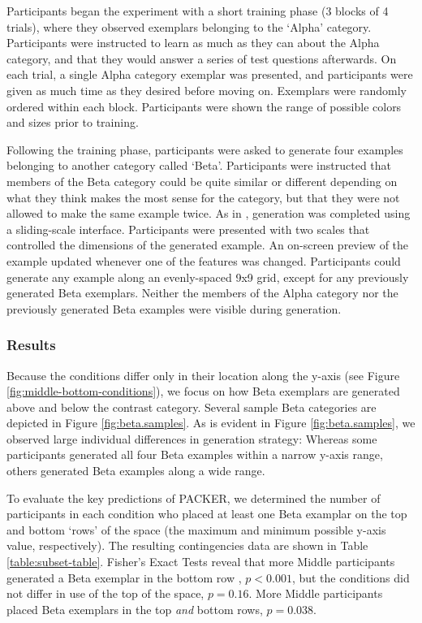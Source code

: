 \documentclass[10pt,letterpaper]{article}
\begin{document}
Participants began the experiment with a short training phase (3 blocks of 4 trials), where they observed exemplars belonging to the `Alpha' category. Participants were instructed to learn as much as they can about the Alpha category, and that they would answer a series of test questions afterwards. On each trial, a single Alpha category exemplar was presented, and participants were given as much time as they desired before moving on. Exemplars were randomly ordered within each block. Participants were shown the range of possible colors and sizes prior to training.

Following the training phase, participants were asked to generate four examples belonging to another category called `Beta'. Participants were instructed that members of the Beta category could be quite similar or different depending on what they think makes the most sense for the category, but that they were not allowed to make the same example twice. As in \citet{jern2013probabilistic}, generation was completed using a sliding-scale interface. Participants were presented with two scales that controlled the dimensions of the generated example. An on-screen preview of the example updated whenever one of the features was changed. Participants could generate any example along an evenly-spaced 9x9 grid, except for any previously generated Beta exemplars. Neither the members of the Alpha category nor the previously generated Beta examples were visible during generation. 

\subsubsection{Results}

Because the conditions differ only in their location along the y-axis (see Figure \ref{fig:middle-bottom-conditions}), we focus on how Beta exemplars are generated above and below the contrast category. Several sample Beta categories are depicted in Figure \ref{fig:beta.samples}. As is evident in Figure \ref{fig:beta.samples}, we observed large individual differences in generation strategy: Whereas some participants generated all four Beta examples within a narrow y-axis range, others generated Beta examples along a wide range. 

To evaluate the key predictions of PACKER, we determined the number of participants in each condition who placed at least one Beta examplar on the top and bottom `rows' of the space (the maximum and minimum possible y-axis value, respectively). The resulting contingencies data are shown in Table \ref{table:subset-table}. Fisher's Exact Tests reveal that more Middle participants generated a Beta exemplar in the bottom row , $p < 0.001$, but the conditions did not differ in use of the top of the space, $p = 0.16$. More Middle participants placed Beta exemplars in the top \textit{and} bottom rows, $p = 0.038$. 
\end{document}
